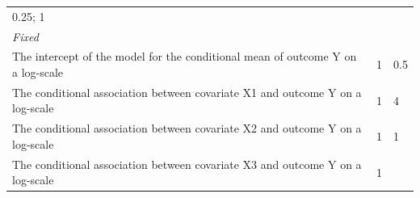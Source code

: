 \documentclass[10,a4paperpaper,]{article}
\begin{document}
\begin{longtable}[]{@{}lll@{}}
\begin{minipage}[t]{0.43\columnwidth}
0.25; 1\strut
\end{minipage}\tabularnewline
\begin{minipage}[t]{0.37\columnwidth}\raggedright
\emph{Fixed}\strut
\end{minipage} & \begin{minipage}[t]{0.12\columnwidth}\raggedright
\strut
\end{minipage} & \begin{minipage}[t]{0.43\columnwidth}\raggedright
\strut
\end{minipage}\tabularnewline
\begin{minipage}[t]{0.37\columnwidth}\raggedright
The intercept of the model for the conditional mean of outcome Y on a
log-scale\strut
\end{minipage} & \begin{minipage}[t]{0.12\columnwidth}\raggedright
1\strut
\end{minipage} & \begin{minipage}[t]{0.43\columnwidth}\raggedright
0.5\strut
\end{minipage}\tabularnewline
\begin{minipage}[t]{0.37\columnwidth}\raggedright
The conditional association between covariate X1 and outcome Y on a
log-scale\strut
\end{minipage} & \begin{minipage}[t]{0.12\columnwidth}\raggedright
1\strut
\end{minipage} & \begin{minipage}[t]{0.43\columnwidth}\raggedright
4\strut
\end{minipage}\tabularnewline
\begin{minipage}[t]{0.37\columnwidth}\raggedright
The conditional association between covariate X2 and outcome Y on a
log-scale\strut
\end{minipage} & \begin{minipage}[t]{0.12\columnwidth}\raggedright
1\strut
\end{minipage} & \begin{minipage}[t]{0.43\columnwidth}\raggedright
1\strut
\end{minipage}\tabularnewline
\begin{minipage}[t]{0.37\columnwidth}\raggedright
The conditional association between covariate X3 and outcome Y on a
log-scale\strut
\end{minipage} & \begin{minipage}[t]{0.12\columnwidth}\raggedright
1\strut
\end{minipage} & \begin{minipage}[t]{0.43\columnwidth}\raggedright

\end{minipage}
\end{longtable}
\end{document}
